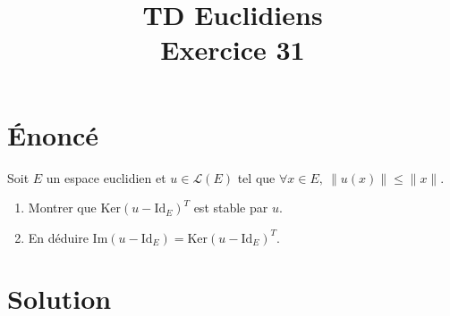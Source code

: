 \documentclass[french]{article}
\title{TD Euclidiens\\ Exercice 31}
\date{}
\renewcommand{\ker}{\text{Ker}}
\begin{document}
\maketitle

\section{Énoncé}
Soit $E$ un espace euclidien et $u\in\mathcal{L}(E)$ tel que $\forall x\in E,\ \lVert u(x)\rVert\leqslant\lVert x\rVert$.
\begin{enumerate}
	\item Montrer que $\ker(u-\text{Id}_E)^T$ est stable par $u$.
	\item En déduire $\text{Im}(u-\text{Id}_E)=\ker(u-\text{Id}_E)^T$.
\end{enumerate}
\section{Solution}
\end{document}
